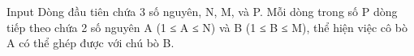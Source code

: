 Input
Dòng đầu tiên chứa 3 số nguyên, N, M, và P. Mỗi dòng trong số P dòng tiếp theo chứa 2 số nguyên A (1 ≤ A ≤ N) và B (1 ≤ B ≤ M), thể hiện việc cô bò A có thể ghép được với chú bò B.